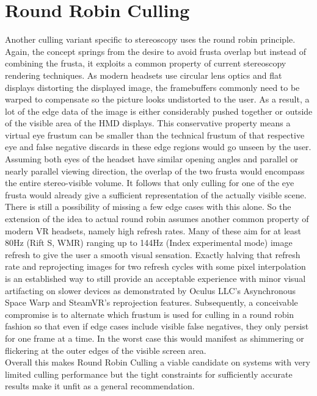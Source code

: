 \section{Round Robin Culling} \label{RRCull}
Another culling variant specific to stereoscopy uses the round robin principle. Again, the concept springs from the desire to avoid frusta overlap but instead of combining the frusta, it exploits a common property of current stereoscopy rendering techniques. As modern headsets use circular lens optics and flat displays distorting the displayed image, the framebuffers commonly need to be warped to compensate so the picture looks undistorted to the user. As a result, a lot of the edge data of the image is either considerably pushed together or outside of the visible area of the HMD displays.
This conservative property means a virtual eye frustum can be smaller than the technical frustum of that respective eye and false negative discards in these edge regions would go unseen by the user.
Assuming both eyes of the headset have similar opening angles and parallel or nearly parallel viewing direction, the overlap of the two frusta would encompass the entire stereo-visible volume. It follows that only culling for one of the eye frusta would already give a sufficient representation of the actually visible scene. \\

There is still a possibility of missing a few edge cases with this alone. So the extension of the idea to actual round robin assumes another common property of modern \gls{VR} headsets, namely high refresh rates. Many of these aim for at least 80Hz (Rift S, \gls{WMR}) ranging up to 144Hz (Index experimental mode) image refresh to give the user a smooth visual sensation.
Exactly halving that refresh rate and reprojecting images for two refresh cycles with some pixel interpolation is an established way to still provide an acceptable experience with minor visual artifacting on slower devices as demonstrated by Oculus LLC's Asynchronous Space Warp\cite{Beeler.2016} and SteamVR's reprojection\cite{ValveCorporation.2018} features. Subsequently, a conceivable compromise is to alternate which frustum is used for culling in a round robin fashion so that even if edge cases include visible false negatives, they only persist for one frame at a time. In the worst case this would manifest as shimmering or flickering at the outer edges of the visible screen area. \\

Overall this makes Round Robin Culling a viable candidate on systems with very limited culling performance but the tight constraints for sufficiently accurate results make it unfit as a general recommendation. 

